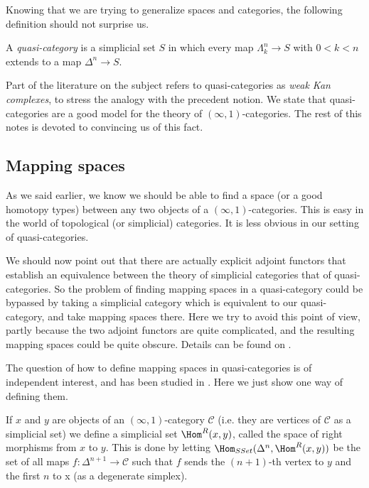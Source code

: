Knowing that we are trying to generalize spaces and categories, the following definition should not surprise us.

\begin{defin}
A \emph{quasi-category} is a simplicial set $S$ in which every map $\Lambda_k^n \to S$ with $0<k<n$ extends to a map $\Delta^n \to S$.
\end{defin}

Part of the literature on the subject refers to quasi-categories as \emph{weak Kan complexes}, to stress the analogy with the precedent notion.
We state that quasi-categories are a good model for the theory of $(\infty,1)$-categories. The rest of this notes is devoted to convincing us of this fact.

\subsection{Mapping spaces}

As we said earlier, we know we should be able to find a space (or a good homotopy types) between any two objects of a $(\infty,1)$-categories. This is easy in the world of topological (or simplicial) categories. It is less obvious in our setting of quasi-categories.

We should now point out that there are actually explicit adjoint functors that establish an equivalence between the theory of simplicial categories that of quasi-categories. So the problem of finding mapping spaces in a quasi-category could be bypassed by taking a simplicial category which is equivalent to our quasi-category, and take mapping spaces there. Here we try to avoid this point of view, partly because the two adjoint functors are quite complicated, and the resulting mapping spaces could be quite obscure. Details can be found on \cite{htt}.

The question of how to define mapping spaces in quasi-categories is of independent interest, and has been studied in \cite{DS}. Here we just show one way of defining them.

If $x$ and $y$ are objects of an $(\infty,1)$-category $\mathcal C$ (i.e. they are vertices of $\mathcal C$ as a simplicial set) we define a simplicial set $\Hom^R(x,y)$, called the space of right morphisms from $x$ to $y$. This is done by letting $\Hom_{SSet}(\Delta^n,\Hom^R(x,y))$ be the set of all maps $f: \Delta^{n+1} \to \mathcal C$ such that $f$ sends the $(n+1)$-th vertex to $y$ and the first $n$ to x (as a degenerate simplex).

